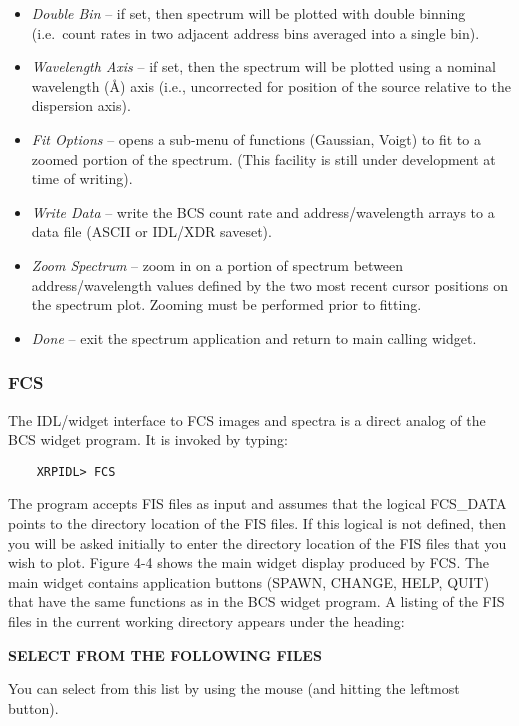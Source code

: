 {{{\begin{itemize}
\item{\it Double Bin} -- if set, then spectrum will be plotted
with double binning
(i.e.\ count rates in two adjacent address bins averaged into a single bin).

\item{\it Wavelength Axis} -- if set, then the spectrum 
will be plotted using a nominal wavelength (\AA) axis 
(i.e., uncorrected for position of the source relative to the dispersion axis).

\item{\it Fit Options} -- opens a sub-menu of functions (Gaussian,
Voigt) to fit to a zoomed portion of the spectrum. (This facility
is still under development at time of writing). 

\item{\it Write Data} -- write the BCS count rate and address/wavelength
arrays
to a data file (ASCII or IDL/XDR saveset).

\item{\it Zoom Spectrum} -- zoom in on a portion of spectrum
between address/wavelength values defined by the two most recent cursor
positions on the spectrum plot. Zooming must be performed prior to fitting.

\item{\it Done} -- exit the spectrum application and return to main calling widget.
\end{itemize}

\subsubsection{FCS}

The IDL/widget interface to FCS images and spectra is a direct analog
of the BCS widget program.
It is invoked by typing:
\begin{verbatim}
    XRPIDL> FCS
\end{verbatim}
The program accepts FIS files as input and assumes that the logical
FCS\_DATA points to the directory  location of the FIS files. If this logical
is not defined, then you will be asked initially to  enter the directory
location of the FIS files that you wish to plot. Figure 4-4 
shows the main widget display produced by FCS.  The main widget
contains application buttons (SPAWN, CHANGE, HELP, QUIT) that have the same
functions as in the BCS widget program. A listing of the FIS files in the
current working directory appears under the heading: 
\newline
\newline
\centerline{\bf SELECT FROM THE FOLLOWING FILES}  
\newline
\newline
You can select from this list by using the mouse (and hitting the leftmost button).  

}}}
